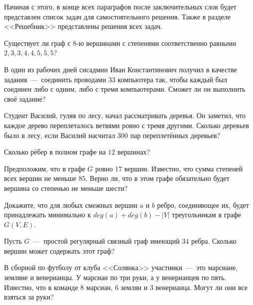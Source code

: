 	Начиная с этого, в конце всех параграфов после заключительных слов будет представлен список задач для самостоятельного решения. Также в разделе <<Решебник>> представлены решения всех задач.
		
\newpage
{}

\begin{exersize}
	Существует ли граф с $8$-ю вершинами с степенями соответственно равными $2, 3, 3, 4, 4, 5, 5, 5$?
\end{exersize}

\begin{exersize}
	В один из рабочих дней сисадмин Иван Константинович получил в качестве задания~---~соединить проводами $33$ компьютера так, чтобы каждый был соединен либо с одним, либо с тремя компьютерами. Сможет ли он выполнить своё задание?
\end{exersize}

\begin{exersize}
	Студент Василий, гуляя по лесу, начал рассматривать деревья. Он заметил, что каждое дерево переплеталось ветвями ровно с тремя другими. Сколько деревьев было в лесу, если Василий насчитал $300$ пар переплетённых деревьев?
\end{exersize}

\begin{exersize}
	Сколько рёбер в полном графе на $12$ вершинах?
\end{exersize}

\begin{exersize}
	Предположим, что в графе $G$ ровно $17$ вершин. Известно, что сумма степеней всех вершин не меньше $85$. Верно ли, что в этом графе обязательно будет вершина со степенью не меньше шести?
\end{exersize}

\begin{exersize}
	Докажите, что для любых смежных вершин $a$ и $b$ ребро, соединяющее их, будет принадлежать минимально к $deg (a) + deg (b) - |V|$ треугольникам в графе $G(V, E)$.
\end{exersize}

\begin{exersize}
	Пусть $G$~---~простой регулярный связный граф имеющий 34 ребра. Сколько вершин может содержать этот граф?
\end{exersize}

\begin{exersize}
	В сборной по футболу от клуба <<Солянка>> участники~---~это марсиане, земляне и венерианцы. У марсиан по три руки, а у венерианцев по пять. Известно, что в команде $8$ марсиан, $6$ землян и $3$ венерианца. Могут ли они все взяться за руки?
\end{exersize}

